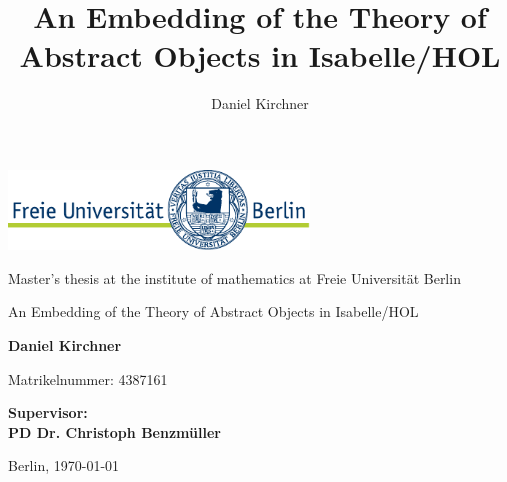 \documentclass[a4paper,enabledeprecatedfontcommands,abstract=on,twoside=true]{scrreprt}
\title{An Embedding of the Theory of Abstract Objects in Isabelle/HOL}
\author{Daniel Kirchner}
\numberwithin{TODO}{chapter}
\numberwithin{equation}{section}
\begin{document}
\begin{titlepage}
\vspace{1cm}

\begin{center}
    \includegraphics[width=0.6\textwidth]{logo}
    \vspace{1cm}


Master's thesis at the institute of mathematics at Freie Universit\"at Berlin

    \vspace{2cm}


    \Large{\textsf{An Embedding of the Theory of Abstract Objects in Isabelle/HOL}}

    \vspace{2cm}

    \large{\textbf{Daniel Kirchner}}

	\vspace{0.25cm}

	\small{Matrikelnummer: 4387161}

    \vspace{2cm}

    \large{\textbf{
        Supervisor:\\
PD Dr. Christoph Benzm\"uller
    }}

    \vspace{2cm}
    \large{Berlin, \today}
\end{center}
\end{titlepage}

\cleardoublepage
\end{document}
